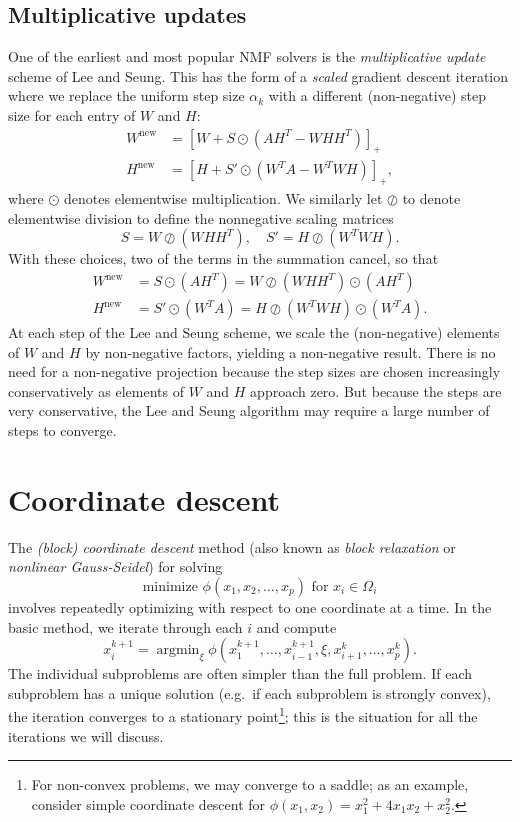 \documentclass[12pt, leqno]{article} %
\begin{document}

\subsection{Multiplicative updates}

One of the earliest and most popular NMF solvers is the
{\em multiplicative update} scheme of Lee and Seung.  This has the
form of a {\em scaled} gradient descent iteration where we
replace the uniform step size $\alpha_k$ with a different
(non-negative) step size for each entry of $W$ and $H$:
\begin{align*}
  W^{\mathrm{new}} &=
  \left[
    W + S \odot \left( AH^T - W H H^T \right)
  \right]_+ \\
  H^{\mathrm{new}} &=
  \left[
    H + S' \odot \left( W^T A - W^T W H \right)
  \right]_+,  
\end{align*}
where $\odot$ denotes elementwise multiplication.
We similarly let $\oslash$ to denote elementwise division
to define the nonnegative scaling matrices
\[
  S  = W \oslash (WHH^T), \quad
  S' = H \oslash (W^TWH).
\]
With these choices, two of the terms in the summation cancel, so that
\begin{align*}
  W^{\mathrm{new}} &= S  \odot (AH^T) = W \oslash (WHH^T) \odot (AH^T) \\
  H^{\mathrm{new}} &= S' \odot (W^TA) = H \oslash (W^TWH) \odot (W^TA).
\end{align*}
At each step of the Lee and Seung scheme, we scale the (non-negative)
elements of $W$ and $H$ by non-negative factors, yielding a
non-negative result.  There is no need for a non-negative projection
because the step sizes are chosen increasingly conservatively as
elements of $W$ and $H$ approach zero.  But because the steps are
very conservative, the Lee and Seung algorithm may require a large
number of steps to converge.

\section{Coordinate descent}

The {\em (block) coordinate descent} method (also known as
{\em block relaxation} or {\em nonlinear Gauss-Seidel}) for solving
\[
  \mbox{minimize } \phi(x_1, x_2, \ldots, x_p)
  \mbox{ for } x_i \in \Omega_i
\]
involves repeatedly optimizing with respect to one coordinate at a
time.  In the basic method, we iterate through each $i$ and compute
\[
  x_i^{k+1} =
  \operatorname{argmin}_\xi \phi(x_1^{k+1}, \ldots, x_{i-1}^{k+1}, \xi,
                                 x_{i+1}^k, \ldots, x_p^k).
\]
The individual subproblems are often simpler than the full problem.
If each subproblem has a unique solution (e.g.~if each subproblem is
strongly convex), the iteration converges to a stationary
point\footnote{
  For non-convex problems, we may converge to a saddle; as an example,
  consider simple coordinate descent
  for $\phi(x_1, x_2) = x_1^2 + 4 x_1 x_2 + x_2^2$.
}; this is the situation for all the iterations we will discuss.
\end{document}
